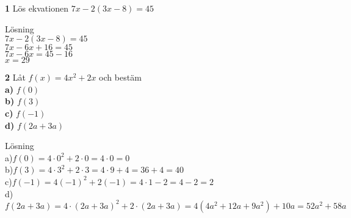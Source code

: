 \documentclass{article}
\begin{document}
\textbf{1} Lös ekvationen $7x-2(3x-8)=45$

Lösning\\
$7x-2(3x-8)=45$\\
$7x-6x+16=45$\\
$7x-6x=45-16$\\
$x=29$

\textbf{2} Låt $f(x)=4x^{2}+2x$ och bestäm\\
\textbf{a)} $f(0)$\\
\textbf{b)} $f(3)$\\
\textbf{c)} $f(-1)$\\
\textbf{d)} $f(2a + 3a)$

Lösning\\
a)$f(0)=4\cdot0^2+2\cdot0=4\cdot0=0$\\
b)$f(3)=4\cdot3^2+2\cdot3=4\cdot9+4=36+4=40$\\
c)$f(-1)=4(-1)^2+2(-1)=4\cdot1-2=4-2=2$\\
d)$f(2a+3a)=4\cdot(2a+3a)^2+2\cdot(2a+3a)=4(4a^2+12a+9a^2)+10a=52a^2+58a$
\end{document}
